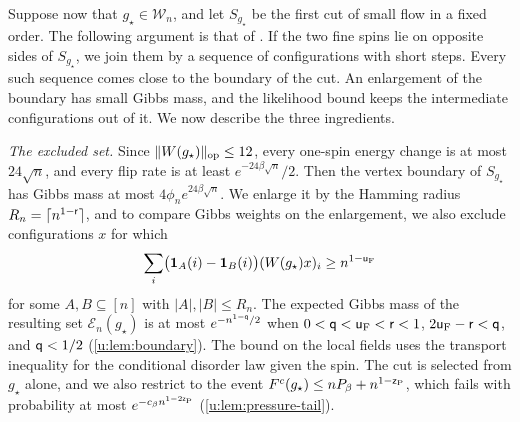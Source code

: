 Suppose now that $g_\star\in\mathcal W_n$, and let $S_{g_\star}$ be the first
cut of small flow in a fixed order. The following argument is that of
\cite[Section~6]{oai-typical-upper}. If the two fine spins lie on opposite
sides of $S_{g_\star}$, we join them by a sequence of configurations with
short steps. Every such sequence comes close to the boundary of the cut. An
enlargement of the boundary has small Gibbs mass, and the likelihood bound
keeps the intermediate configurations out of it. We now describe the three
ingredients.

\emph{The excluded set.} Since $\lVert W(g_\star)\rVert_{\rm op}\le12$, every
one-spin energy change is at most $24\sqrt n$, and every flip rate is at least
$e^{-24\beta\sqrt n}/2$. Then the vertex boundary of $S_{g_\star}$ has Gibbs mass
at most $4\phi_ne^{24\beta\sqrt n}$. We enlarge it by the Hamming radius
$R_n=\lceil n^{1-\mathsf{r}}\rceil$, and to compare Gibbs weights on the
enlargement, we also exclude configurations $x$ for which
\[
 \sum_i\bigl(\mathbf 1_A(i)-\mathbf 1_B(i)\bigr)
     (W(g_\star)x)_i\ge n^{1-\mathsf{u}_{\rm F}}
\]
for some $A,B\subseteq[n]$ with $|A|,|B|\le R_n$.
The expected Gibbs mass of the resulting set
$\mathcal E_n(g_\star)$ is at most
$e^{-n^{1-\mathsf{q}}/2}$ when $0<\mathsf{q}<\mathsf{u}_{\rm F}<\mathsf{r}<1$,
$2\mathsf{u}_{\rm F}-\mathsf{r}<\mathsf{q}$, and $\mathsf{q}<1/2$ (\cref{u:lem:boundary}). The
bound on the local fields uses the transport inequality for the conditional
disorder law given the spin. The cut is selected from $g_\star$ alone, and we
also restrict to the event $F^c(g_\star)\le nP_\beta+n^{1-\mathsf{z}_{\rm P}}$,
which fails with probability at most $e^{-c_\beta n^{1-2\mathsf{z}_{\rm P}}}$
(\cref{u:lem:pressure-tail}).

